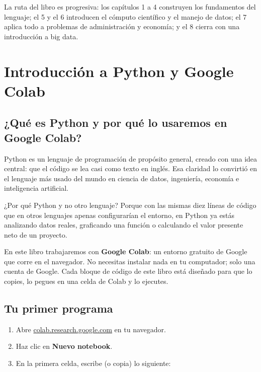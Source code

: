 \documentclass[
  spanish,
  letterpaper,
  DIV=11,
  numbers=noendperiod]{scrreprt}
\providecommand{\tightlist}{%
  \setlength{\itemsep}{0pt}\setlength{\parskip}{0pt}}
\begin{document}
La ruta del libro es progresiva: los capítulos 1 a 4 construyen los
fundamentos del lenguaje; el 5 y el 6 introducen el cómputo científico y
el manejo de datos; el 7 aplica todo a problemas de administración y
economía; y el 8 cierra con una introducción a big data.


\chapter{Introducción a Python y Google
Colab}\label{introducciuxf3n-a-python-y-google-colab}

\section{¿Qué es Python y por qué lo usaremos en Google
Colab?}\label{quuxe9-es-python-y-por-quuxe9-lo-usaremos-en-google-colab}

Python es un lenguaje de programación de propósito general, creado con
una idea central: que el código se lea casi como texto en inglés. Esa
claridad lo convirtió en el lenguaje más usado del mundo en ciencia de
datos, ingeniería, economía e inteligencia artificial.

¿Por qué Python y no otro lenguaje? Porque con las mismas diez líneas de
código que en otros lenguajes apenas configurarían el entorno, en Python
ya estás analizando datos reales, graficando una función o calculando el
valor presente neto de un proyecto.

En este libro trabajaremos con \textbf{Google Colab}: un entorno
gratuito de Google que corre en el navegador. No necesitas instalar nada
en tu computador; solo una cuenta de Google. Cada bloque de código de
este libro está diseñado para que lo copies, lo pegues en una celda de
Colab y lo ejecutes.

\section{Tu primer programa}\label{tu-primer-programa}

\begin{enumerate}
\def\labelenumi{\arabic{enumi}.}
\tightlist
\item
  Abre
  \href{https://colab.research.google.com}{colab.research.google.com} en
  tu navegador.
\item
  Haz clic en \textbf{Nuevo notebook}.
\item
  En la primera celda, escribe (o copia) lo siguiente:
\end{enumerate}
\end{document}
